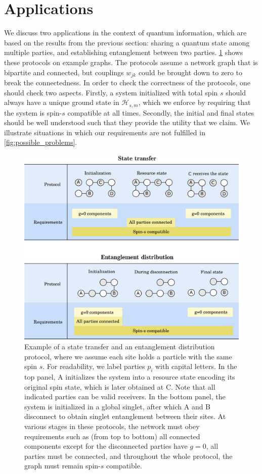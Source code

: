 \section{Applications}
\label{sec:applications}




We discuss two applications in the context of quantum information, which are based on the results from the previous section: sharing a quantum state among multiple parties, and establishing entanglement between two parties. \cref{fig:possible_graphs} shows these protocols on example graphs. The protocols assume a network graph that is bipartite and connected, but couplings $w_{jk}$ could be brought down to zero to break the connectedness. In order to check the correctness of the protocols, one should check two aspects. Firstly, a system initialized with total spin $s$ should always have a unique ground state in $\mathcal{H}_{s,m}$, which we enforce by requiring that the system is spin-$s$ compatible at all times. Secondly, the initial and final states should be well understood such that they provide the utility that we claim. We illustrate situations in which our requirements are not fulfilled in \cref{fig:possible_problems}.

\begin{figure}
\centering
\includegraphics[width=.95\textwidth]{img_manuscript/applications_column.pdf} 
\caption{Example of a state transfer and an entanglement distribution protocol, where we assume each site holds a particle with the same spin $s$. For readability, we label parties $p_i$ with capital letters. In the top panel, A initializes the system into a resource state encoding its original spin state, which is later obtained at C. Note that all indicated parties can be valid receivers. In the bottom panel, the system is initialized in a global singlet, after which A and B disconnect to obtain singlet entanglement between their sites. At various stages in these protocols, the network must obey requirements such as (from top to bottom) all connected components except for the disconnected parties have $g=0$, all parties must be connected, and throughout the whole protocol, the graph must remain spin-$s$ compatible. }
\label{fig:possible_graphs}
\end{figure}

